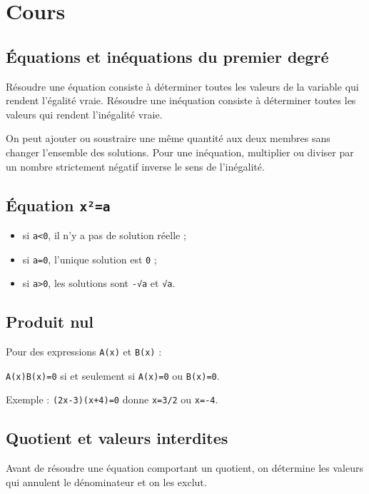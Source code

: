 \section{Cours}

\subsection{Équations et inéquations du premier degré}

Résoudre une équation consiste à déterminer toutes les valeurs de la variable qui rendent l'égalité vraie. Résoudre une inéquation consiste à déterminer toutes les valeurs qui rendent l'inégalité vraie.

On peut ajouter ou soustraire une même quantité aux deux membres sans changer l'ensemble des solutions. Pour une inéquation, multiplier ou diviser par un nombre strictement négatif inverse le sens de l'inégalité.

\subsection{Équation \texttt{x²=a}}

\begin{itemize}
\item si \texttt{a<0}, il n'y a pas de solution réelle ;
\item si \texttt{a=0}, l'unique solution est \texttt{0} ;
\item si \texttt{a>0}, les solutions sont \texttt{-√a} et \texttt{√a}.
\end{itemize}

\subsection{Produit nul}

Pour des expressions \texttt{A(x)} et \texttt{B(x)} :

\texttt{A(x)B(x)=0} si et seulement si \texttt{A(x)=0} ou \texttt{B(x)=0}.

Exemple : \texttt{(2x-3)(x+4)=0} donne \texttt{x=3/2} ou \texttt{x=-4}.

\subsection{Quotient et valeurs interdites}

Avant de résoudre une équation comportant un quotient, on détermine les valeurs qui annulent le dénominateur et on les exclut.

